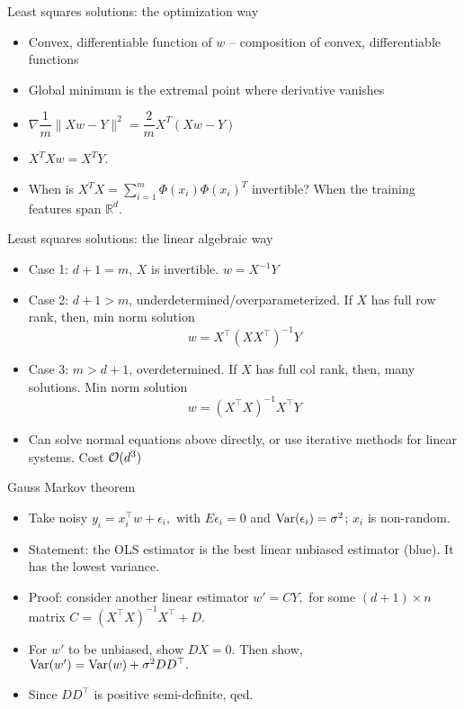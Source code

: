 \documentclass[final]{beamer}
\begin{document}
\begin{frame}{Least squares solutions: the optimization way}
	\begin{itemize}
		\item Convex, differentiable function of $w$ -- composition of convex, differentiable functions
		\pause
		\item Global minimum is the extremal point where derivative vanishes
		\pause
		\item $\nabla \dfrac{1}{m}\|X w - Y\|^2 = \dfrac{2}{m} X^T(Xw - Y)$
		\pause
		\item $X^T X w = X^T Y$. 
		\pause
		\item When is $X^T X = \sum_{i=1}^m \Phi(x_i) \Phi(x_i)^T$ invertible? When the training features span $\mathbb{R}^d$.  
	\end{itemize}
\end{frame}
\begin{frame}{Least squares solutions: the linear algebraic way}
	\begin{itemize}
		\item Case 1: $d+1 = m$, $X$ is invertible. $w = X^{-1} Y$
		\pause 
	\item Case 2: $d+1 > m$, underdetermined/overparameterized. If $X$ has full row rank, then, min norm solution	$$ w = X^\top (X X^\top)^{-1} Y$$
\pause
	\item Case 3: $m > d+1$, overdetermined. If $X$ has full col rank, then, many solutions. Min norm solution $$w = (X^\top X)^{-1} X^\top Y$$
	\pause
\item Can solve normal equations above directly, or use iterative methods for linear systems. Cost ${\cal O}(d^3)$ 
\end{itemize}
\end{frame}
\begin{frame}{Gauss Markov theorem}
	\begin{itemize}
		\item Take noisy $y_i = x_i^\top w  + \epsilon_i,$ with $E\epsilon_i = 0$ and ${\rm Var}(\epsilon_i) = \sigma^2$; $x_i$ is non-random.
		\pause
		\item Statement: the OLS estimator is the best linear unbiased estimator (blue). It has the lowest variance.
		\pause
	\item Proof: consider another linear estimator $w' = C Y,$ for some $(d+1)\times n$ matrix $C =  (X^\top X)^{-1} X^\top + D$. 
	\pause 
	\item For $w'$ to be unbiased, show $DX = 0$. Then show, ${\rm Var}(w') = {\rm Var}(w) + \sigma^2 DD^\top.$
	\pause
	\item Since $DD^\top$ is positive semi-definite, qed.
	\end{itemize}
\end{frame}
\end{document}

